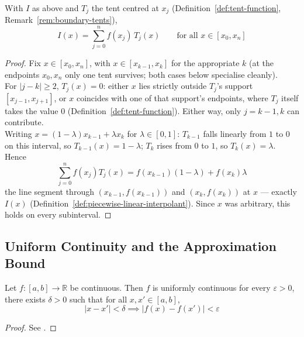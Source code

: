 		\begin{proposition}
			\label{prop:interpolant-tent-sum}
			With $I$ as above and $T_j$ the tent centred at $x_j$ (Definition~\ref{def:tent-function}, Remark~\ref{rem:boundary-tents}),
			\[
				I(x) = \sum_{j=0}^{n} f(x_j)\,T_j(x) \qquad \text{for all } x\in[x_0,x_n]
			\]
		\end{proposition}
		
		\begin{proof}
			Fix $x\in[x_0,x_n]$, with $x\in[x_{k-1},x_k]$ for the appropriate $k$ (at the endpoints $x_0,x_n$ only one tent survives; both cases below specialise cleanly). \\
			
			For $|j-k|\ge2$, $T_j(x)=0$: either $x$ lies strictly outside $T_j$'s support $[x_{j-1},x_{j+1}]$, or $x$ coincides with one of that support's endpoints, where $T_j$ itself takes the value $0$ (Definition~\ref{def:tent-function}). Either way, only $j=k-1,k$ can contribute. \\
			
			Writing $x=(1-\lambda)x_{k-1}+\lambda x_k$ for $\lambda\in[0,1]$: $T_{k-1}$ falls linearly from $1$ to $0$ on this interval, so $T_{k-1}(x)=1-\lambda$; $T_k$ rises from $0$ to $1$, so $T_k(x)=\lambda$. Hence
			\[
				\sum_{j=0}^n f(x_j)T_j(x) = f(x_{k-1})(1-\lambda) + f(x_k)\lambda
			\]
			the line segment through $(x_{k-1},f(x_{k-1}))$ and $(x_k,f(x_k))$ at $x$ — exactly $I(x)$ (Definition~\ref{def:piecewise-linear-interpolant}). Since $x$ was arbitrary, this holds on every subinterval.
		\end{proof}
		
	\subsection{Uniform Continuity and the Approximation Bound}
		
		\begin{theorem}
			\label{thm:uniform-continuity}
			Let $f:[a,b]\to\mathbb{R}$ be continuous. Then $f$ is uniformly continuous for every $\varepsilon>0$, there exists $\delta>0$ such that for all $x,x'\in[a,b]$,
			\[
				|x-x'|<\delta \implies |f(x)-f(x')|<\varepsilon
			\]
		\end{theorem}
		
		\begin{proof}
			See \cite[\S4.19]{Rudin1976}.
		\end{proof}
		
